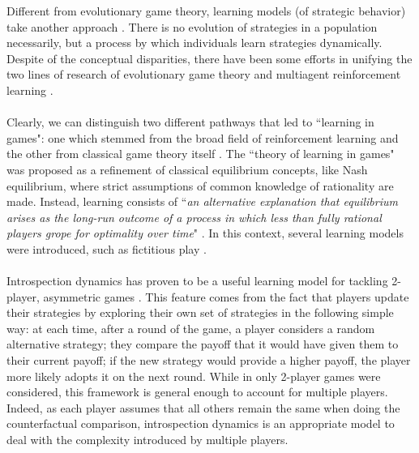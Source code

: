\documentclass[11pt]{article}
\theoremstyle{plainCl1}
\theoremstyle{plainCl2}
\begin{document}

\noindent Different from evolutionary game theory, learning models (of strategic behavior) take another approach \cite{Sandholm:BioSys:1996, Fudenberg:book:1998b, Macy:PNAS:2002, Hofbauer:GEB:2005, Tuyls:bookchapter:2005, Galla:PNAS:2013, Barfuss:PRE:2019, Barfuss:PNAS:2020, Pangallo:GEB:2022}. There is no evolution of strategies in a population necessarily, but a process by which individuals learn strategies dynamically. 
Despite of the conceptual disparities, there have been some efforts in unifying the two lines of research of evolutionary game theory and multiagent reinforcement learning \cite{Macy:PNAS:2002, Tuyls:bookchapter:2005}. 
\\ \\
\noindent Clearly, we can distinguish two different pathways that led to ``learning in games": one which stemmed from the broad field of reinforcement learning \cite{Sandholm:BioSys:1996} and the other from classical game theory itself \cite{fudenberg:book:1998b}. The ``theory of learning in games" was proposed as a refinement of classical equilibrium concepts, like Nash equilibrium, where strict assumptions of common knowledge of rationality are made. Instead, learning consists of ``\textit{an alternative explanation that equilibrium arises as the long-run outcome of a process in which less than fully rational players grope for optimality over time}" \cite{fudenberg:book:1998b}. In this context, several learning models were introduced, such as fictitious play \cite{bibid}.
\\  \\
\noindent Introspection dynamics has proven to be a useful learning model for tackling 2-player, asymmetric games \cite{Couto:NJP:2022}.
This feature comes from the fact that players update their strategies by exploring their own set of strategies in the following simple way: at each time, after a round of the game, a player considers a random alternative strategy; they compare the payoff that it would have given them to their current payoff; if the new strategy would provide a higher payoff, the player more likely adopts it on the next round. While in \cite{Couto:NJP:2022} only 2-player games were considered, this framework is general enough to account for multiple players. Indeed, as each player assumes that all others remain the same when doing the counterfactual comparison, introspection dynamics is an appropriate model to deal with the complexity introduced by multiple players.
\end{document}
